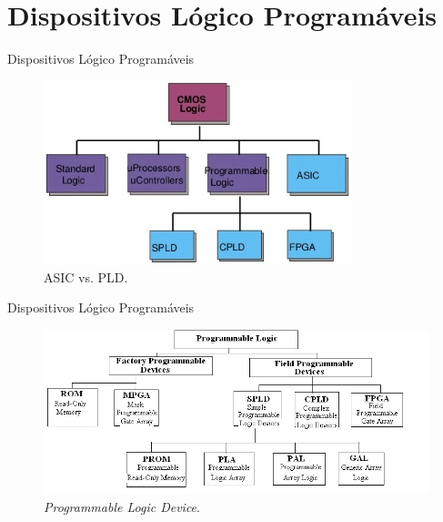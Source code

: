 

\section{Dispositivos Lógico Programáveis}
	\begin{frame}{Dispositivos Lógico Programáveis}
		\begin{figure}[H]
			\centering
			\includegraphics[width=0.8\textwidth]{img/intro/arvore.jpg}
			\caption{ASIC vs. PLD.}
		\end{figure}
	\end{frame}

	\begin{frame}{Dispositivos Lógico Programáveis}
		\begin{figure}[H]
			\centering
			\includegraphics[width=1.0\textwidth]{img/intro/arvore-pld.png}
			\caption{\textit{Programmable Logic Device}.}
		\end{figure}
	\end{frame}

